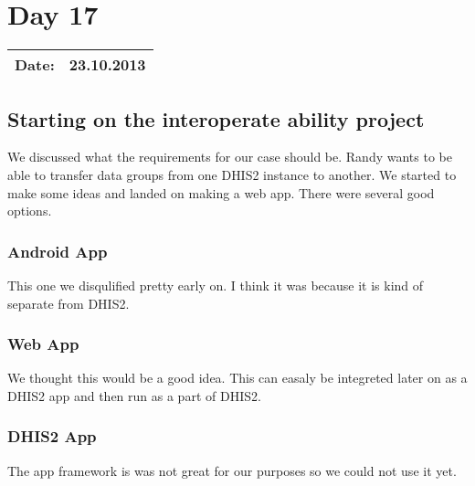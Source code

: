 \section{Day 17}
\begin{tabular}{|c|c|}
\hline
Date: & 23.10.2013 \\
\hline
\end{tabular}
\subsection{Starting on the interoperate ability project}
We discussed what the requirements for our case should be.
Randy wants to be able to transfer data groups from one DHIS2 instance to another.
We started to make some ideas and landed on making a web app. There were several good options.
\subsubsection{Android App}
This one we disqulified pretty early on. I think it was because it is kind of separate from DHIS2.
\subsubsection{Web App}
We thought this would be a good idea. This can easaly be integreted later on as a DHIS2 app and then run as a part of DHIS2.
\subsubsection{DHIS2 App}
The app framework is was not great for our purposes so we could not use it yet.
